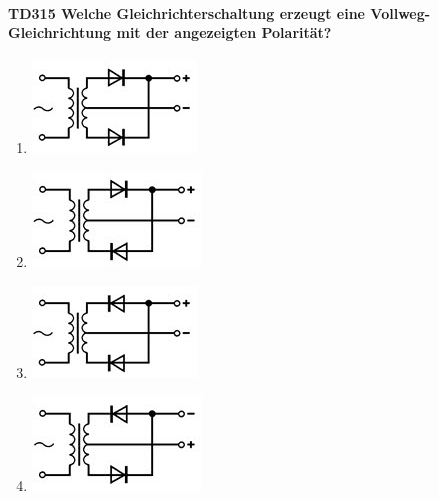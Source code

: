 \documentclass[8pt]{article}
\begin{document}
\begin{enumerate}
\begin{enumerate}[nolistsep,label=\Alph*]
\paragraph*{TD315 Welche Gleichrichterschaltung erzeugt eine Vollweg-Gleichrichtung mit der angezeigten Polarität?}
\begin{enumerate}[nolistsep,label=\Alph*]
\item
\begin{center}
	\begin{minipage}{\linewidth}
		\centering
		\includegraphics[scale=1.0]{pics/td315_a.jpg}
	\end{minipage}
\end{center}
\item
\begin{center}
	\begin{minipage}{\linewidth}
		\centering
		\includegraphics[scale=1.0]{pics/td315_b.jpg}
	\end{minipage}
\end{center}
\item
\begin{center}
	\begin{minipage}{\linewidth}
		\centering
		\includegraphics[scale=1.0]{pics/td315_c.jpg}
	\end{minipage}
\end{center}
\item
\begin{center}
	\begin{minipage}{\linewidth}
		\centering
		\includegraphics[scale=1.0]{pics/td315_d.jpg}
	\end{minipage}
\end{center}
\end{enumerate}


\end{enumerate}
\end{enumerate}
\end{document}
